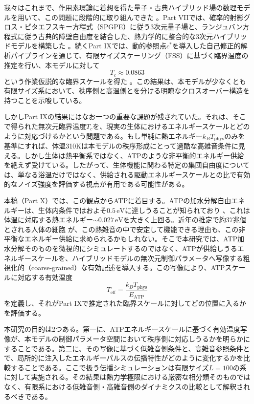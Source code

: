 \documentclass[a4paper,11pt,ja=standard,lualatex]{bxjsarticle}
\begin{document}
我々はこれまで、作用素環論に着想を得た量子・古典ハイブリッド場の数理モデルを用いて、この問題に段階的に取り組んできた \cite{Konno2025v7, Konno2025v8}。Part VIIでは、確率的射影グロス・ピタエフスキー方程式（SPGPE）に従う3次元量子場と、ランジュバン方程式に従う古典的障壁自由度を結合した、熱力学的に整合的な3次元ハイブリッドモデルを構築した \cite{Konno2025v7}。続くPart IXでは、動的参照点$c^*$を導入した自己修正的解析パイプラインを通じて、有限サイズスケーリング（FSS）に基づく臨界温度の推定を行い、本モデルに対して
\begin{equation}
T_c \approx 0.0863
\end{equation}
という作業仮説的な臨界スケールを得た \cite{Konno2025v9}。この結果は、本モデルが少なくとも有限サイズ系において、秩序側と高温側とを分ける明瞭なクロスオーバー構造を持つことを示唆している。

しかしPart IXの結果にはなお一つの重要な課題が残されていた。それは、そこで得られた無次元臨界温度$T_c$を、現実の生体におけるエネルギースケールとどのように対応づけるかという問題である。もし単純に熱エネルギー$k_B T_{\mathrm{phys}}$のみを基準にすれば、体温310Kは本モデルの秩序形成にとって過酷な高雑音条件に見える。しかし生体は熱平衡系ではなく、ATPのような非平衡的エネルギー供給を絶えず受けている。したがって、生体機能に関わる特定の集団自由度については、単なる浴温だけではなく、供給される駆動エネルギースケールとの比で有効的なノイズ強度を評価する視点が有用である可能性がある。

本稿（Part X）では、この観点からATPに着目する。ATPの加水分解自由エネルギーは、生体内条件ではおよそ$0.5\,\mathrm{eV}$に達しうることが知られており \cite{Phillips2012, Milo2015}、これは体温に対応する熱エネルギー$\sim 0.027\,\mathrm{eV}$を大きく上回る。近年の推定で約37兆個とされる人体の細胞 \cite{Bianconi2013} が、この熱雑音の中で安定して機能できる理由も、この非平衡なエネルギー供給に求められるかもしれない。そこで本研究では、ATP加水分解そのものを微視的にシミュレートするのではなく、ATPが供給しうるエネルギースケールを、ハイブリッドモデルの無次元制御パラメータへ写像する粗視化的（coarse-grained）な有効記述を導入する。この写像により、ATPスケールに対応する有効温度
\begin{equation}
T_{\mathrm{eff}} = \frac{k_B T_{\mathrm{phys}}}{E_{\mathrm{ATP}}}
\end{equation}
を定義し、それがPart IXで推定された臨界スケールに対してどの位置に入るかを評価する。

本研究の目的は2つある。第一に、ATPエネルギースケールに基づく有効温度写像が、本モデルの制御パラメータ空間において秩序側に対応しうるかを明らかにすることである。第二に、その写像に基づく低雑音側条件と、高雑音参照条件とで、局所的に注入したエネルギーパルスの伝播特性がどのように変化するかを比較することである。ここで扱う伝播シミュレーションは有限サイズ$L=100$の系に対して実施される。その結果は熱力学極限における厳密な相分類そのものではなく、有限系における低雑音側・高雑音側のダイナミクスの比較として解釈されるべきである。
\end{document}
